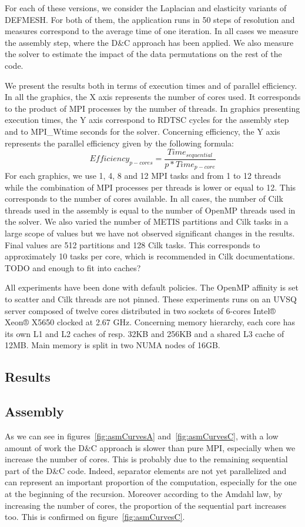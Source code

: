 \documentclass{IOS-Book-Article}
\begin{document}
For each of these versions, we consider the Laplacian and elasticity variants of DEFMESH.
For both of them, the application runs in 50 steps of resolution and measures correspond to the average time of one iteration.
In all cases we measure the assembly step, where the D\&C approach has been applied.
We also measure the solver to estimate the impact of the data permutations on the rest of the code.

We present the results both in terms of execution times and of parallel efficiency.
In all the graphics, the X axis represents the number of cores used. It corresponds to the product of MPI processes by the number of threads.
In graphics presenting execution times, the Y axis correspond to RDTSC cycles for the assembly step and to MPI\_Wtime seconds for the solver.
Concerning efficiency, the Y axis represents the parallel efficiency given by the following formula:
$$Efficiency_{p-cores} = \frac{Time_{sequential}}{p*Time_{p-core}}$$
For each graphics, we use 1, 4, 8 and 12 MPI tasks and from 1 to 12 threads while the combination of MPI processes per threads is lower or equal to 12.
This corresponds to the number of cores available. In all cases, the number of Cilk threads used in the assembly is equal to the number of OpenMP threads used in the solver.
We also varied the number of METIS partitions and Cilk tasks in a large scope of values but we have not observed significant changes in the results.
Final values are 512 partitions and 128 Cilk tasks. This corresponds to approximately 10 tasks per core, which is recommended in Cilk documentations. TODO and enough to fit into caches?

All experiments have been done with default policies. The OpenMP affinity is set to scatter and Cilk threads are not pinned.
These experiments runs on an UVSQ server composed of twelve cores distributed in two sockets of 6-cores Intel® Xeon® X5650 clocked at 2.67 GHz.
Concerning memory hierarchy, each core has its own L1 and L2 caches of resp. 32KB and 256KB and a shared L3 cache of 12MB. Main memory is split in two NUMA nodes of 16GB.

\subsection{Results}
\subsection{Assembly}
As we can see in figures~\ref{fig:asmCurvesA} and~\ref{fig:asmCurvesC}, with a low amount of work the D\&C approach is slower than pure MPI, especially when we increase
the number of cores.
This is probably due to the remaining sequential part of the D\&C code.
Indeed, separator elements are not yet parallelized and can represent an important proportion of the computation, especially for the one at the beginning of the recursion.
Moreover according to the Amdahl law, by increasing the number of cores, the proportion of the sequential part increases too. This is confirmed on figure~\ref{fig:asmCurvesC}.
\end{document}
